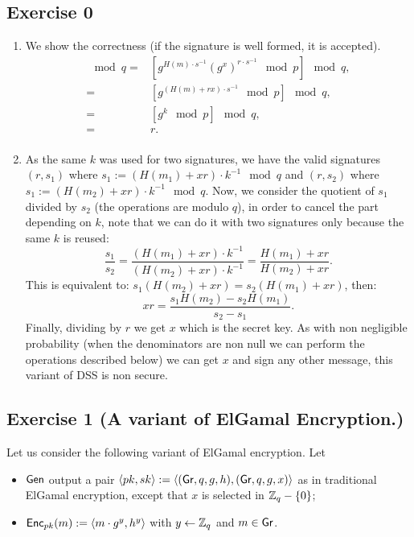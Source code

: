 
\section{}
\subsection{Exercise 0}
\begin{solution}
\begin{enumerate}
	\item We show the correctness (if the signature is well formed, it is accepted).
	\begin{align*}
 [g^{u_1} y^{u_2} \mod p] \mod q = &[g^{H(m)\cdot s^{-1}} (g^x)^{r
 	\cdot s^{-1}} \mod p] \mod q,\\
= &[g^{(H(m)+rx)	\cdot s^{-1}} \mod p] \mod q,\\
= &[g^{k} \mod p] \mod q,\\
= &r .\\
	\end{align*}
	
	\item As the same $k$ was used for two signatures, we have the valid signatures $(r,s_1)$ where $s_1:=(H(m_1) + xr) \cdot k^{-1} \mod
	q$ and $(r,s_2)$ where $s_1:=(H(m_2) + xr) \cdot k^{-1} \mod
	q$. Now, we consider the quotient of $s_1$ divided by $s_2$ (the operations are modulo $q$), in order to cancel the part depending on $k$, note that we can do it with two signatures only because the same $k$ is reused:
	\[\frac{s_1}{s_2}=\frac{(H(m_1) + xr) \cdot k^{-1}}{(H(m_2) + xr) \cdot k^{-1}}=\frac{H(m_1) + xr}{H(m_2) + xr} .\]
	This is equivalent to: $s_1 (H(m_2) + xr)= s_2 (H(m_1) + xr)$, then: 
	\[xr= \frac{s_1 H(m_2) - s_2 H(m_1)}{s_2-s_1}.\]
	Finally, dividing by $r$ we get $x$ which is the secret key. As with non negligible probability (when the denominators are non null we can perform the operations described below) we can get $x$ and sign any other message, this variant of DSS is non secure.
		
\end{enumerate}

\end{solution}


\subsection{Exercise 1 (A variant of ElGamal Encryption.)}
Let us consider the following variant of ElGamal encryption.  Let
\begin{itemize}
	\item $\operatorname{\mathsf{Gen}}$ output a pair
	$\langle pk, sk \rangle := \langle(\operatorname{\mathsf{Gr}}, q, g, h), (\operatorname{\mathsf{Gr}}, q, g, x)
	\rangle$ as in traditional ElGamal encryption, except that $x$ is selected in $\mathbb{Z}_q - \{0\}$; 
	\item $\operatorname{\mathsf{Enc}}_{pk}(m) := \langle m\cdot g^y, h^y\rangle$ with $y \leftarrow \mathbb{Z}_q$ and $m \in \operatorname{\mathsf{Gr}}$. 
\end{itemize}

